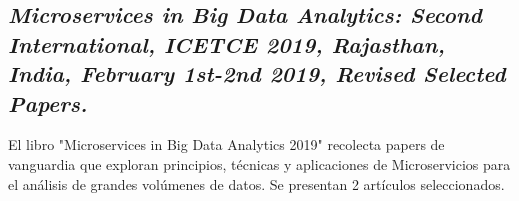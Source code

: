 
\subsection{
    \textbf{\emph{Microservices in Big Data Analytics: Second International, {ICETCE} 2019, Rajasthan, India, February 1st-2nd 2019, Revised Selected Papers.}
    }
}

El libro "Microservices in Big Data Analytics 2019"\cite{chaudharyMicroservices2020} recolecta papers de vanguardia que exploran principios, técnicas y aplicaciones de Microservicios para el análisis de grandes volúmenes de datos.
Se presentan 2 artículos seleccionados.\par



